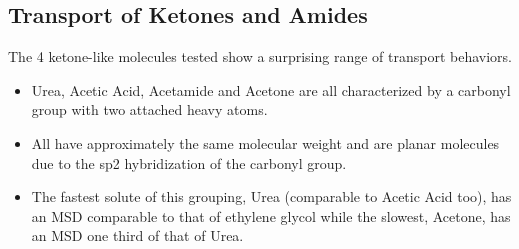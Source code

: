 \documentclass{article}
\begin{document}
  

  \subsection*{Transport of Ketones and Amides}
  
  The 4 ketone-like molecules tested show a surprising range of transport behaviors.
  \begin{itemize}
    \item Urea, Acetic Acid, Acetamide and Acetone are all characterized by a carbonyl group
    with two attached heavy atoms. 
    \item All have approximately the same molecular weight and are planar molecules due to
    the sp2 hybridization of the carbonyl group.
    \item The fastest solute of this grouping, Urea (comparable to Acetic Acid too), has an
    MSD comparable to that of ethylene glycol while the slowest, Acetone, has an MSD one 
    third of that of Urea.
  \end{itemize}
  
\end{document}
